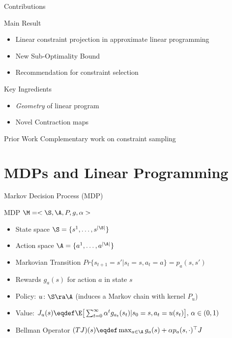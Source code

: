 \documentclass[handout,10pt]{beamer}
\begin{document}
\begin{frame}[fragile]{Contributions}
\begin{block}{Main Result}
\begin{itemize}
\item Linear constraint projection in approximate linear programming
\item New Sub-Optimality Bound
\item Recommendation for constraint selection
\end{itemize}
\end{block}
\begin{block}{Key Ingredients}
\begin{itemize}
\item \emph{Geometry} of linear program
\item Novel Contraction maps
\end{itemize}
\end{block}
\begin{block}{Prior Work}
Complementary work on constraint sampling
\end{block}
\end{frame}

\section{MDPs and Linear Programming}

\begin{frame}[fragile]{Markov Decision Process (MDP)}

\begin{block}{MDP $\M=<\S,\A,P,g,\alpha>$}
\begin{itemize}
\item State space $\S=\{s^1,\ldots,s^{|\S|}\}$\p
\item Action space $\A=\{a^1,\ldots,a^{|\A|}\}$\p
\item Markovian Transition $Pr\{s_{t+1}=s'| s_t=s, a_t=a\}=p_a(s,s')$ \p
\item Rewards $g_a(s)$ for action $a$ in state $s$\p
\end{itemize}
\end{block}
\begin{block}{}
\begin{itemize}
\item Policy: $u\colon \S\ra \A$ (induces a Markov chain with kernel $P_u$)\p
\item Value: $J_u(s)\eqdef \E\big[\sum_{t=0}^\infty \alpha^t g_{a_t}(s_t)|s_0=s,a_t=u(s_t)\big],\,\alpha\in (0,1)$\p
\item Bellman Operator $(TJ)(s)\eqdef\max_{a\in \A} g_a(s)+\alpha p_a(s,\cdot)^\top J$
\end{itemize}
\end{block}
\end{frame}
\end{document}

